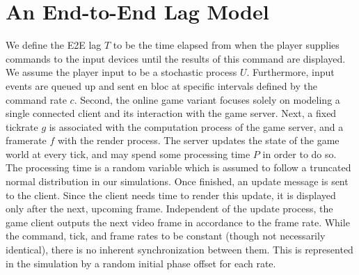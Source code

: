 \section{An End-to-End Lag Model}
\label{sec:model}


We define the \gls{E2E} lag $T$ to be the time elapsed from when the player supplies commands to the input devices until the results of this command are displayed. We assume the player input to be a stochastic process $U$. Furthermore, input events are queued up and sent en bloc at specific intervals defined by the command rate $c$. Second, the online game variant focuses solely on modeling a single connected client and its interaction with the game server. Next, a fixed tickrate $g$ is associated with the computation process of the game server, and a framerate $f$ with the render process. The server updates the state of the game world at every tick, and may spend some processing time $P$ in order to do so. The processing time is a random variable which is assumed to follow a truncated normal distribution in our simulations. Once finished, an update message is sent to the client. Since the client needs time to render this update, it is displayed only after the next, upcoming frame. Independent of the update process, the game client outputs the next video frame in accordance to the frame rate.
While the command, tick, and frame rates to be constant (though not necessarily identical), there is no inherent synchronization between them. This is represented in the simulation by a random initial phase offset for each rate.

